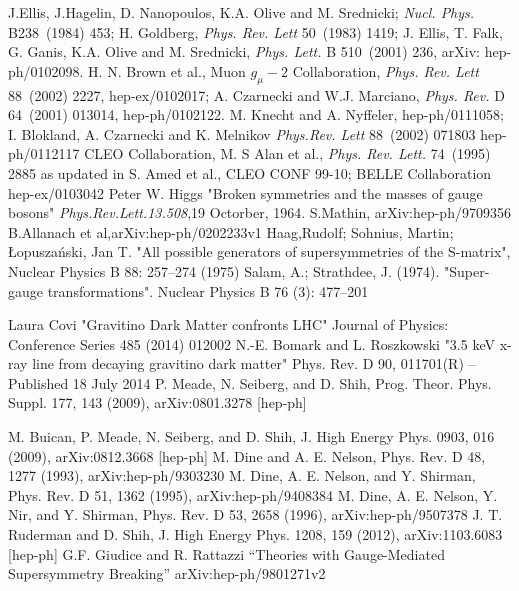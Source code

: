 \begin{thebibliography}{9}




J.Ellis, J.Hagelin, D. Nanopoulos, K.A. Olive and M. Srednicki; \emph{Nucl. Phys.} B238~(1984) 453; H. Goldberg, \emph{Phys. Rev. Lett} 50~(1983) 1419;
J. Ellis, T. Falk, G. Ganis, K.A. Olive and M. Srednicki, \emph{Phys. Lett.} B 510~(2001) 236, arXiv: hep-ph/0102098.
H. N. Brown et al., Muon $g_{\mu}-2$ Collaboration, \emph{Phys. Rev. Lett} 88~(2002) 2227, hep-ex/0102017; A. Czarnecki and W.J. Marciano,
\emph{ Phys. Rev.} D 64~(2001) 013014, hep-ph/0102122.
M. Knecht and A. Nyffeler, hep-ph/0111058; I. Blokland, A. Czarnecki and K. Melnikov \emph{Phys.Rev. Lett} 88~(2002) 071803 hep-ph/0112117
CLEO Collaboration, M. S Alan et al., \emph{Phys. Rev. Lett.} 74~(1995) 2885 as updated in S. Amed et al., CLEO CONF 99-10; 
 BELLE Collaboration hep-ex/0103042
 Peter W. Higgs "Broken symmetries and the masses of gauge bosons" \emph{Phys.Rev.Lett.13.508},19 Octorber, 1964.
S.Mathin, arXiv:hep-ph/9709356
B.Allanach et al,arXiv:hep-ph/0202233v1
Haag,Rudolf; Sohnius, Martin; Łopuszański, Jan T. "All possible generators of supersymmetries of the S-matrix", Nuclear Physics B 88: 257–274 (1975)
 Salam, A.; Strathdee, J. (1974). "Super-gauge transformations". Nuclear Physics B 76 (3): 477–201

Laura Covi "Gravitino Dark Matter confronts LHC" Journal of Physics: Conference Series 485 (2014) 012002
 N.-E. Bomark and L. Roszkowski "3.5 keV x-ray line from decaying gravitino dark matter"
Phys. Rev. D 90, 011701(R) – Published 18 July 2014
P. Meade, N. Seiberg, and D. Shih, Prog. Theor. Phys.
Suppl. 177, 143 (2009), arXiv:0801.3278 [hep-ph]

M. Buican, P. Meade, N. Seiberg, and D. Shih, J. High Energy Phys. 0903, 016 (2009), arXiv:0812.3668 [hep-ph]
M. Dine and A. E. Nelson, Phys. Rev. D 48, 1277
(1993), arXiv:hep-ph/9303230
M. Dine, A. E. Nelson, and Y. Shirman, Phys. Rev. D
51, 1362 (1995), arXiv:hep-ph/9408384
M. Dine, A. E. Nelson, Y. Nir, and Y. Shirman, Phys.
Rev. D 53, 2658 (1996), arXiv:hep-ph/9507378
 J. T. Ruderman and D. Shih, J. High Energy Phys.
1208, 159 (2012), arXiv:1103.6083 [hep-ph]
G.F. Giudice and R. Rattazzi ``Theories with Gauge-Mediated Supersymmetry Breaking'' arXiv:hep-ph/9801271v2


\end{thebibliography}
